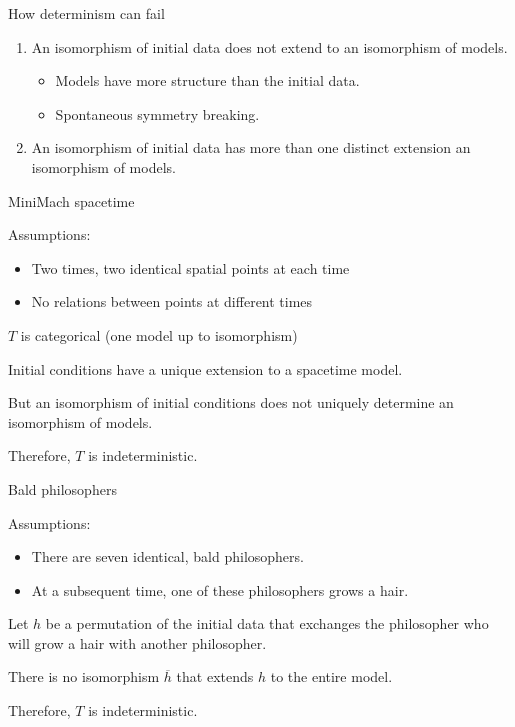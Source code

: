 \documentclass[fleqn]{beamer}
\begin{document}
\begin{frame}{How determinism can fail}

  \begin{enumerate}
  \item An isomorphism of initial data does not extend to an
    isomorphism of models.
    \begin{itemize}
      \item Models have more structure than the initial data.
      \item Spontaneous symmetry breaking.
    \end{itemize}
  \item An isomorphism of initial data has more than one distinct
    extension an isomorphism of models.
  \end{enumerate}


\end{frame}

\begin{frame}{MiniMach spacetime}

  Assumptions:
  \begin{itemize}
  \item Two times, two identical spatial points at each time
  \item No relations between points at different times
  \end{itemize}

  \hrulefill

  $T$ is categorical (one model up to isomorphism)

  Initial conditions have a unique extension to a spacetime model.

  But an isomorphism of initial conditions does not uniquely determine
  an isomorphism of models.

  Therefore, $T$ is indeterministic.


\end{frame}

\begin{frame}{Bald philosophers}

  Assumptions:
  \begin{itemize}
  \item There are seven identical, bald philosophers.
  \item At a subsequent time, one of these philosophers grows a hair.
  \end{itemize}

  \hrulefill

  Let $h$ be a permutation of the initial data that exchanges the
  philosopher who will grow a hair with another philosopher.

  There is no isomorphism $\overline{h}$ that extends $h$ to the
  entire model.

  Therefore, $T$ is indeterministic.


\end{frame}
\end{document}
